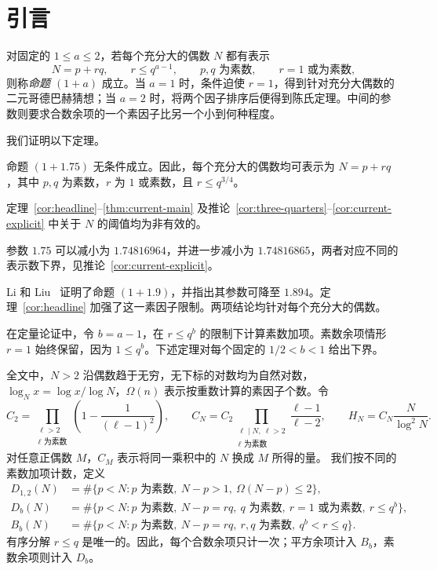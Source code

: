 \section{引言}
\label{sec:current-statement}

对固定的 $1\le a\le2$，若每个充分大的偶数 $N$ 都有表示
\[
 N=p+rq,\qquad r\le q^{a-1},\qquad
 p,q\text{ 为素数},\qquad r=1\text{ 或为素数},
\]
则称\emph{命题 $(1+a)$} 成立。当 $a=1$ 时，条件迫使 $r=1$，得到针对充分大偶数的二元哥德巴赫猜想；当 $a=2$ 时，将两个因子排序后便得到陈氏定理。中间的参数则要求合数余项的一个素因子比另一个小到何种程度。

我们证明以下定理。

\begin{theorem}
\label{cor:headline}
命题 $(1+1.75)$ 无条件成立。因此，每个充分大的偶数均可表示为 $N=p+rq$，其中 $p,q$ 为素数，$r$ 为 $1$ 或素数，且 $r\le q^{3/4}$。
\end{theorem}

定理~\ref{cor:headline}--\ref{thm:current-main} 及推论~\ref{cor:three-quarters}--\ref{cor:current-explicit} 中关于 $N$ 的阈值均为非有效的。

参数 $1.75$ 可以减小为 $1.74816964$，并进一步减小为 $1.74816865$，两者对应不同的表示数下界，见推论~\ref{cor:current-explicit}。

Li 和 Liu~\cite[定理~1.1]{LiLiu} 证明了命题 $(1+1.9)$，并指出其参数可降至 $1.894$。定理~\ref{cor:headline} 加强了这一素因子限制。两项结论均针对每个充分大的偶数。

在定量论证中，令 $b=a-1$，在 $r\le q^b$ 的限制下计算素数加项。素数余项情形 $r=1$ 始终保留，因为 $1\le q^b$。下述定理对每个固定的 $1/2<b<1$ 给出下界。

全文中，$N>2$ 沿偶数趋于无穷，无下标的对数均为自然对数，$\log_N x=\log x/\log N$，$\Omega(n)$ 表示按重数计算的素因子个数。令
\begin{equation}
 C_2=\prod_{\substack{\ell>2\\\ell\text{ 为素数}}}
 \left(1-\frac1{(\ell-1)^2}\right),\qquad
 C_N=C_2\prod_{\substack{\ell\mid N,\ \ell>2\\\ell\text{ 为素数}}}
 \frac{\ell-1}{\ell-2},\qquad
 H_N=C_N\frac{N}{\log^2 N}.
 \label{eq:current-normalization}
\end{equation}
对任意正偶数 $M$，$C_M$ 表示将同一乘积中的 $N$ 换成 $M$ 所得的量。
我们按不同的素数加项计数，定义
\begin{align}
 D_{1,2}(N)&=\#\{p<N:p\text{ 为素数},\ N-p>1,
                                      \ \Omega(N-p)\le2\},
                                      \label{eq:current-d12}\\
 D_b(N)&=\#\{p<N:p\text{ 为素数},\ N-p=rq,
       \ q\text{ 为素数},\ r=1\text{ 或为素数},\ r\le q^b\},
                                      \label{eq:current-db}\\
 B_b(N)&=\#\{p<N:p\text{ 为素数},\ N-p=rq,
                \ r,q\text{ 为素数},\ q^b<r\le q\}.
                                      \label{eq:current-bb}
\end{align}
有序分解 $r\le q$ 是唯一的。因此，每个合数余项只计一次；平方余项计入 $B_b$，素数余项则计入 $D_b$。

